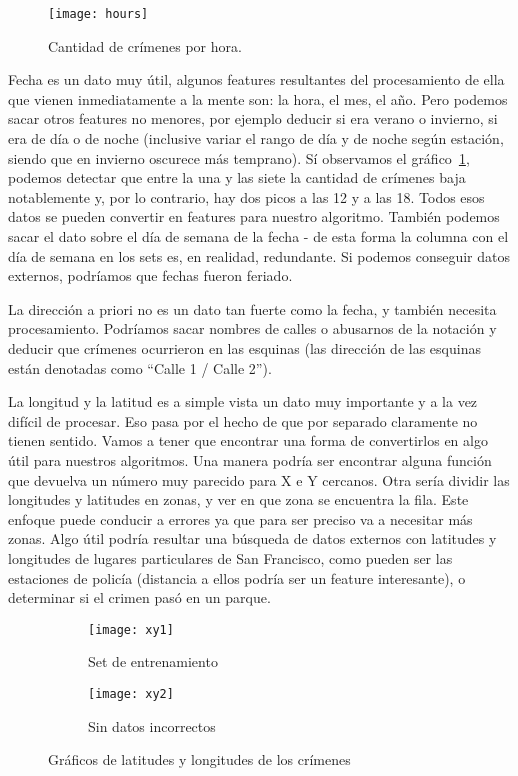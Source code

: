 \begin{figure}[H]
\texttt{[image: hours]}
\caption{Cantidad de crímenes por hora.}
\label{fig:hours}
\end{figure}

Fecha es un dato muy útil, algunos features resultantes del procesamiento de ella que vienen inmediatamente a la mente son: la hora, el mes, el año. Pero podemos sacar otros features no menores, por ejemplo deducir si era verano o invierno, si era de día o de noche (inclusive variar el rango de día y de noche según estación, siendo que en invierno oscurece más temprano). Sí observamos el gráfico~\ref{fig:hours}, podemos detectar que entre la una y las siete la cantidad de crímenes baja notablemente y, por lo contrario, hay dos picos a las 12 y a las 18. Todos esos datos se pueden convertir en features para nuestro algoritmo. También podemos sacar el dato sobre el día de semana de la fecha - de esta forma la columna con el día de semana en los sets es, en realidad, redundante. Si podemos conseguir datos externos, podríamos que fechas fueron feriado.

La dirección a priori no es un dato tan fuerte como la fecha, y también necesita procesamiento. Podríamos sacar nombres de calles o abusarnos de la notación y deducir que crímenes ocurrieron en las esquinas (las dirección de las esquinas están denotadas como ``Calle 1 / Calle 2'').

La longitud y la latitud es a simple vista un dato muy importante y a la vez difícil de procesar. Eso pasa por el hecho de que por separado claramente no tienen sentido. Vamos a tener que encontrar una forma de convertirlos en algo útil para nuestros algoritmos. Una manera podría ser encontrar alguna función que devuelva un número muy parecido para X e Y cercanos. Otra sería dividir las longitudes y latitudes en zonas, y ver en que zona se encuentra la fila. Este enfoque puede conducir a errores ya que para ser preciso va a necesitar más zonas. Algo útil podría resultar una búsqueda de datos externos con latitudes y longitudes de lugares particulares de San Francisco, como pueden ser las estaciones de policía (distancia a ellos podría ser un feature interesante), o determinar si el crimen pasó en un parque.

\begin{figure}[H]
\centering
\begin{subfigure}{.5\textwidth}
  \centering
  \texttt{[image: xy1]}
  \caption{Set de entrenamiento}
  \label{fig:xy1}
\end{subfigure}%
\begin{subfigure}{.5\textwidth}
  \centering
  \texttt{[image: xy2]}
  \caption{Sin datos incorrectos}
  \label{fig:xy2}
\end{subfigure}
\caption{Gráficos de latitudes y longitudes de los crímenes}
\label{fig:xy}
\end{figure}

